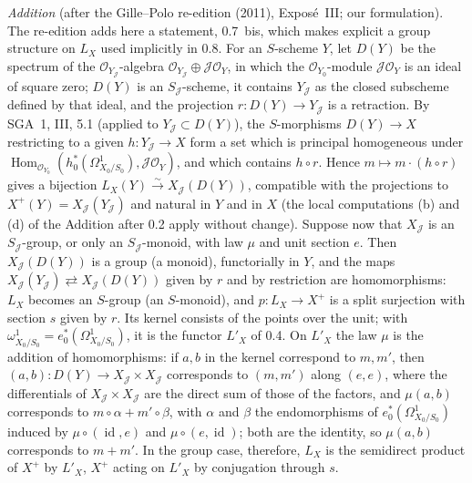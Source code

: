 

\emph{Addition} (after the Gille--Polo re-edition (2011), Exposé~III; our
formulation). The re-edition adds here a statement, 0.7~bis, which makes
explicit a group structure on \(L_X\) used implicitly in 0.8. For an
\(S\)-scheme \(Y\), let \(D(Y)\) be the spectrum of the
\(\mathscr O_{Y_{\mathscr J}}\)-algebra
\(\mathscr O_{Y_{\mathscr J}}\oplus\mathscr J\mathscr O_Y\), in which the
\(\mathscr O_{Y_0}\)-module \(\mathscr J\mathscr O_Y\) is an ideal of square
zero; \(D(Y)\) is an \(S_{\mathscr J}\)-scheme, it contains \(Y_{\mathscr J}\)
as the closed subscheme defined by that ideal, and the projection
\(r\colon D(Y)\to Y_{\mathscr J}\) is a retraction. By SGA~1, III, 5.1
(applied to \(Y_{\mathscr J}\subset D(Y)\)), the \(S\)-morphisms
\(D(Y)\to X\) restricting to a given \(h\colon Y_{\mathscr J}\to X\) form a
set which is principal homogeneous under
\(\operatorname{Hom}_{\mathscr O_{Y_0}}(h_0^*(\Omega^1_{X_0/S_0}),
\mathscr J\mathscr O_Y)\), and which contains \(h\circ r\). Hence
\(m\mapsto m\cdot(h\circ r)\) gives a bijection
\(L_X(Y)\xrightarrow{\sim}X_{\mathscr J}(D(Y))\), compatible with the
projections to \(X^+(Y)=X_{\mathscr J}(Y_{\mathscr J})\) and natural in
\(Y\) and in \(X\) (the local computations (b) and (d) of the Addition
after 0.2 apply without change). Suppose now that \(X_{\mathscr J}\) is an
\(S_{\mathscr J}\)-group, or only an \(S_{\mathscr J}\)-monoid, with law
\(\mu\) and unit section \(e\). Then \(X_{\mathscr J}(D(Y))\) is a group
(a monoid), functorially in \(Y\), and the maps
\(X_{\mathscr J}(Y_{\mathscr J})\rightleftarrows X_{\mathscr J}(D(Y))\)
given by \(r\) and by restriction are homomorphisms: \(L_X\) becomes an
\(S\)-group (an \(S\)-monoid), and \(p\colon L_X\to X^+\) is a split
surjection with section \(s\) given by \(r\). Its kernel consists of the
points over the unit; with \(\omega^1_{X_0/S_0}=e_0^*(\Omega^1_{X_0/S_0})\),
it is the functor \(L'_X\) of 0.4. On \(L'_X\) the law \(\mu\) is the
addition of homomorphisms: if \(a,b\) in the kernel correspond to \(m,m'\),
then \((a,b)\colon D(Y)\to X_{\mathscr J}\times X_{\mathscr J}\) corresponds to
\((m,m')\) along \((e,e)\), where the differentials of
\(X_{\mathscr J}\times X_{\mathscr J}\) are the direct sum of those of the
factors, and \(\mu(a,b)\) corresponds to \(m\circ\alpha+m'\circ\beta\), with
\(\alpha\) and \(\beta\) the endomorphisms of \(e_0^*(\Omega^1_{X_0/S_0})\)
induced by \(\mu\circ(\operatorname{id},e)\) and \(\mu\circ(e,\operatorname{id})\);
both are the identity, so \(\mu(a,b)\) corresponds to \(m+m'\). In the group
case, therefore, \(L_X\) is the semidirect product of \(X^+\) by \(L'_X\),
\(X^+\) acting on \(L'_X\) by conjugation through \(s\).

